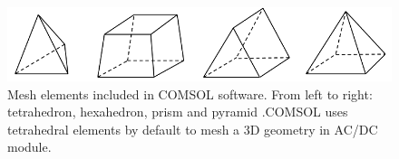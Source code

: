 \begin{figure}[ht]
	\includegraphics[width=\textwidth]{03_Prototype/figures/00_fig/fig006_COMSOL_meshing_elements.png}
	\caption[3D Mesh elements included in COMSOL]{Mesh elements included in COMSOL software. From left to right: tetrahedron, hexahedron, prism and pyramid .COMSOL uses tetrahedral elements by default to mesh a 3D geometry in AC/DC module.}
	\label{chap3:maxwell_gas_log1}
\end{figure}
